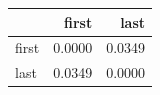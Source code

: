 \begin{tabular}{lrr}
\toprule
 & first & last \\
\midrule
first & 0.0000 & 0.0349 \\
last & 0.0349 & 0.0000 \\
\bottomrule
\end{tabular}
